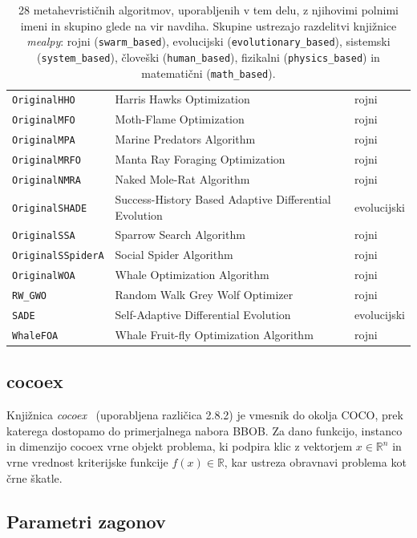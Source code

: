 \documentclass[a4paper, 12pt]{book}
\begin{document}
\begin{table}[p]
\begin{tabular}{@{}lll@{}}
\texttt{OriginalHHO} & Harris Hawks Optimization & rojni \\
\texttt{OriginalMFO} & Moth-Flame Optimization & rojni \\
\texttt{OriginalMPA} & Marine Predators Algorithm & rojni \\
\texttt{OriginalMRFO} & Manta Ray Foraging Optimization & rojni \\
\texttt{OriginalNMRA} & Naked Mole-Rat Algorithm & rojni \\
\texttt{OriginalSHADE} & Success-History Based Adaptive Differential Evolution & evolucijski \\
\texttt{OriginalSSA} & Sparrow Search Algorithm & rojni \\
\texttt{OriginalSSpiderA} & Social Spider Algorithm & rojni \\
\texttt{OriginalWOA} & Whale Optimization Algorithm & rojni \\
\texttt{RW\_GWO} & Random Walk Grey Wolf Optimizer & rojni \\
\texttt{SADE} & Self-Adaptive Differential Evolution & evolucijski \\
\texttt{WhaleFOA} & Whale Fruit-fly Optimization Algorithm & rojni \\
\bottomrule
\end{tabular}
\caption{28 metahevrističnih algoritmov, uporabljenih v tem delu, z njihovimi
polnimi imeni in skupino glede na vir navdiha. Skupine ustrezajo razdelitvi
knjižnice \emph{mealpy}: rojni (\texttt{swarm\_based}), evolucijski
(\texttt{evolutionary\_based}), sistemski (\texttt{system\_based}), človeški
(\texttt{human\_based}), fizikalni (\texttt{physics\_based}) in matematični
(\texttt{math\_based}).}
\label{tab:algoritmi}
\end{table}

\subsection{cocoex}

Knjižnica \emph{cocoex}~\cite{hansen2021coco} (uporabljena različica 2.8.2) je
vmesnik do okolja COCO, prek katerega dostopamo do primerjalnega nabora BBOB.
Za dano funkcijo, instanco in dimenzijo cocoex vrne objekt problema, ki
podpira klic z vektorjem $x \in \mathbb{R}^n$ in vrne vrednost kriterijske funkcije $f(x) \in \mathbb{R}$, kar
ustreza obravnavi problema kot črne škatle.

\subsection{Parametri zagonov}
\label{subsec:parametri}
\end{document}

